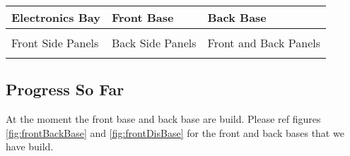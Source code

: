 \documentclass[../../main]{subfiles}
\begin{document}
\begin{center}

    \begin{tabularx} {\textwidth} {
            >{\centering \arraybackslash}X
            >{\centering \arraybackslash}X
            >{\centering \arraybackslash}X
        }

        \toprule

        Electronics Bay & Front Base & Back Base \\ \midrule

        \includegraphics [
            width = 0.3\textwidth,
        ] {pics/elec_bay.png}

        &

        \includegraphics [
            width = 0.3\textwidth,
        ] {pics/front_base.png}

        &

        \includegraphics [
            width = 0.3\textwidth,
        ] {pics/back_base.png}

        \\ \midrule

        Front Side Panels & Back Side Panels & Front and Back Panels \\ \midrule

        \includegraphics [
            width = 0.3\textwidth,
        ] {pics/front_side_panels.png}

        &

        \includegraphics [
            width = 0.3\textwidth,
        ] {pics/back_side_panels.png}

        &

        \includegraphics [
            width = 0.3\textwidth,
        ] {pics/front_back_panels.png}

        \\

        \bottomrule

    \end{tabularx}

    \label{tbl:frameSegments}

\end{center}

\subsection{Progress So Far}

At the moment the front base and back base are build. Please ref figures \ref{fig:frontBackBase} and
\ref{fig:frontDisBase} for the front and back bases that we have build.
\end{document}
